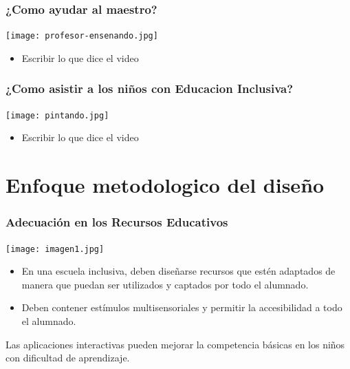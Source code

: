 \documentclass[11pt]{beamer}
\begin{document}
\begin{frame}
\frametitle{¿Como ayudar al maestro?}
    \justify
    \begin{minipage}[c]{0.4\textwidth} 
    \texttt{[image: profesor-ensenando.jpg]} 
    \end{minipage}
    \begin{minipage}[c]{0.55\textwidth}
        \begin{itemize}
        \item Escribir lo que dice el video
        \end{itemize}

    \end{minipage}
\end{frame}

\begin{frame}
\frametitle{¿Como asistir a los niños con Educacion Inclusiva?}
    \justify
    \begin{minipage}[c]{0.4\textwidth} 
    \texttt{[image: pintando.jpg]} 
    \end{minipage}
    \begin{minipage}[c]{0.55\textwidth}
        \begin{itemize}
        \item Escribir lo que dice el video
        \end{itemize}

    \end{minipage}
\end{frame}

\section{Enfoque metodologico del diseño}
\begin{frame}
\frametitle{Adecuación en los Recursos Educativos}
    \justify
    \begin{minipage}[c]{0.4\textwidth} 
    \texttt{[image: imagen1.jpg]} 
    \end{minipage}
    \begin{minipage}[c]{0.55\textwidth}
        \begin{itemize}
        \item En una escuela inclusiva, deben diseñarse recursos que estén adaptados de manera que puedan ser utilizados y captados por todo el alumnado.
        \item Deben contener estímulos multisensoriales y permitir la accesibilidad a todo el alumnado.
        \end{itemize}
        Las aplicaciones interactivas pueden mejorar la competencia básicas en los niños con dificultad de aprendizaje.
    \end{minipage}
\end{frame}
\end{document}
